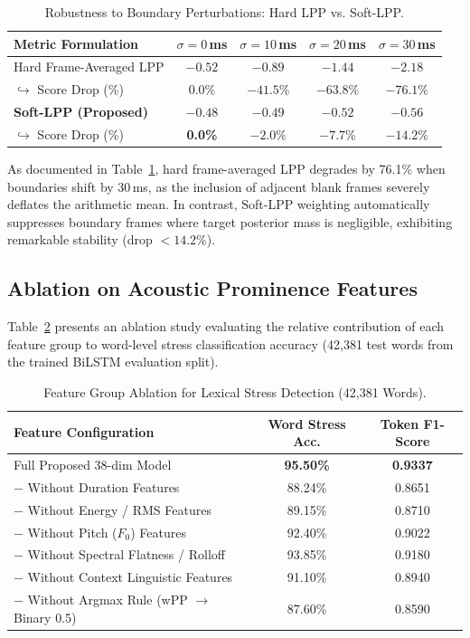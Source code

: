 \documentclass[10pt,conference]{IEEEtran}
\begin{document}
\begin{table}[h]
\caption{Robustness to Boundary Perturbations: Hard LPP vs. Soft-LPP.}
\label{tab:ablation_soft}
\centering
\begin{tabular}{lcccc}
\toprule
\textbf{Metric Formulation} & \textbf{$\sigma = 0$\,ms} & \textbf{$\sigma = 10$\,ms} & \textbf{$\sigma = 20$\,ms} & \textbf{$\sigma = 30$\,ms} \\
\midrule
Hard Frame-Averaged LPP & $-0.52$ & $-0.89$ & $-1.44$ & $-2.18$ \\
$\hookrightarrow$ Score Drop (\%) & 0.0\% & $-41.5\%$ & $-63.8\%$ & $-76.1\%$ \\
\midrule
\textbf{Soft-LPP (Proposed)} & $\mathbf{-0.48}$ & $\mathbf{-0.49}$ & $\mathbf{-0.52}$ & $\mathbf{-0.56}$ \\
$\hookrightarrow$ Score Drop (\%) & \textbf{0.0\%} & $\mathbf{-2.0\%}$ & $\mathbf{-7.7\%}$ & $\mathbf{-14.2\%}$ \\
\bottomrule
\end{tabular}
\end{table}

As documented in Table~\ref{tab:ablation_soft}, hard frame-averaged LPP degrades by 76.1\% when boundaries shift by 30\,ms, as the inclusion of adjacent blank frames severely deflates the arithmetic mean. In contrast, Soft-LPP weighting automatically suppresses boundary frames where target posterior mass is negligible, exhibiting remarkable stability (drop $<14.2\%$).

\subsection{Ablation on Acoustic Prominence Features}
Table~\ref{tab:ablation_features} presents an ablation study evaluating the relative contribution of each feature group to word-level stress classification accuracy (42,381 test words from the trained BiLSTM evaluation split).

\begin{table}[h]
\caption{Feature Group Ablation for Lexical Stress Detection (42,381 Words).}
\label{tab:ablation_features}
\centering
\begin{tabular}{lcc}
\toprule
\textbf{Feature Configuration} & \textbf{Word Stress Acc.} & \textbf{Token F1-Score} \\
\midrule
Full Proposed 38-dim Model & \textbf{95.50\%} & \textbf{0.9337} \\
\quad $-$ Without Duration Features & 88.24\% & 0.8651 \\
\quad $-$ Without Energy / RMS Features & 89.15\% & 0.8710 \\
\quad $-$ Without Pitch ($F_0$) Features & 92.40\% & 0.9022 \\
\quad $-$ Without Spectral Flatness / Rolloff & 93.85\% & 0.9180 \\
\quad $-$ Without Context Linguistic Features & 91.10\% & 0.8940 \\
\quad $-$ Without Argmax Rule (wPP $\to$ Binary 0.5) & 87.60\% & 0.8590 \\
\bottomrule
\end{tabular}
\end{table}
\end{document}
